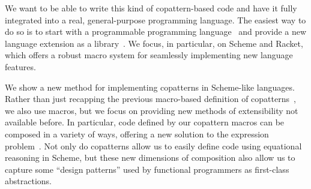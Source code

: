 We want to be able to write this kind of copattern-based code and have it fully integrated into a real, general-purpose programming language.
The easiest way to do so is to start with a programmable programming language~\cite{ProgrammablePL} and provide a new language extension as a library~\cite{LanguageLibrary}. We focus, in particular, on Scheme and Racket, which offers a robust macro system for seamlessly implementing new language features.

We show a new method for implementing copatterns in Scheme-like languages.
Rather than just recapping the previous macro-based definition of copatterns~\cite{LaforgueR17}, we also use macros, but we focus on providing new methods of extensibility not available before.
In particular, code defined by our copattern macros can be composed in a variety of ways,
offering a new solution to the expression problem~\cite{ExpressionProblem}.
Not only do copatterns allow us to easily define code using equational reasoning in Scheme, but these new dimensions of composition also allow us to capture some ``design patterns'' used by functional programmers as first-class abstractions.

